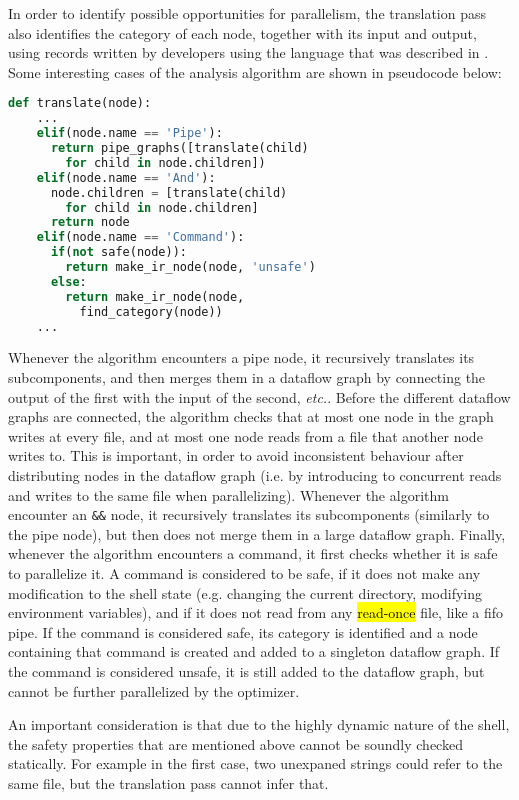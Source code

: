 \documentclass[sigplan,10pt,review,anonymous]{acmart}
\newcommand{\etc}{{\em etc.}\xspace}
\newcommand{\ttt}[1]{\texttt{\small #1}}
\newcommand{\todo}[1]{\hl{#1}\xspace}
\begin{document}
In order to identify possible opportunities for parallelism, the
translation pass also identifies the category of each node, together
with its input and output, using records written by developers using
the language that was described in . Some interesting cases
of the analysis algorithm are shown in pseudocode below:

\begin{lstlisting}[language=python, float=h]
  def translate(node):
    ...
    elif(node.name == 'Pipe'):
      return pipe_graphs([translate(child)
        for child in node.children])
    elif(node.name == 'And'):
      node.children = [translate(child)
        for child in node.children]
      return node
    elif(node.name == 'Command'):
      if(not safe(node)):
        return make_ir_node(node, 'unsafe')
      else:
        return make_ir_node(node,
          find_category(node))
    ...
\end{lstlisting}

Whenever the algorithm encounters a pipe node, it recursively
translates its subcomponents, and then merges them in a dataflow graph
by connecting the output of the first with the input of the second,
\etc. Before the different dataflow graphs are connected, the
algorithm checks that at most one node in the graph writes at every
file, and at most one node reads from a file that another node writes
to. This is important, in order to avoid inconsistent behaviour after
distributing nodes in the dataflow graph (i.e. by introducing to
concurrent reads and writes to the same file when
parallelizing). Whenever the algorithm encounter an \ttt{\&\&} node,
it recursively translates its subcomponents (similarly to the pipe
node), but then does not merge them in a large dataflow
graph. Finally, whenever the algorithm encounters a command, it first
checks whether it is safe to parallelize it. A command is considered
to be safe, if it does not make any modification to the shell state
(e.g. changing the current directory, modifying environment
variables), and if it does not read from any \todo{read-once} file,
like a fifo pipe. If the command is considered safe, its category is
identified and a node containing that command is created and added to
a singleton dataflow graph. If the command is considered unsafe, it is
still added to the dataflow graph, but cannot be further parallelized
by the optimizer.

An important consideration is that due to the highly dynamic nature of
the shell, the safety properties that are mentioned above cannot be
soundly checked statically. For example in the first case, two
unexpaned strings could refer to the same file, but the translation
pass cannot infer that.
\end{document}
